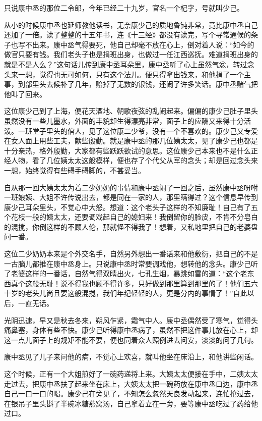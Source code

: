\documentclass[12pt,UTF8]{ctexbook}
\begin{document}
{{{只说康中丞的那位二令郎，今年已经二十九岁，官名一个杞字，号就叫少己。

从小的时候康中丞也延师教他读书，无奈康少己的质地鲁钝非常，竟比康中丞自己还加了一倍。读了整整的十五年书，连《十三经》都没有读完，写个寻常通候的条子也写不出来。康中丞气得要死，他自己却毫不放在心上，倒对着人说：“如今的做官只要有钱。我们老头子也是捐班出身，也做过一任江西巡抚。难道捐班出身的就是不是人么？”这句话儿传到康中丞耳朵里，康中丞听了心上虽然气忿，转过念头来一想，觉得也无可如何，只有这个法儿。便只得拿出钱来，和他捐了一个主事，到部里头去候补了几年，赔掉了无数的银钱，还闹了许多笑话。康中丞赌气把他叫了回来。

这位康少己到了上海，便花天酒地、朝歌夜弦的乱闹起来。偏偏的康少己肚子里头虽然没有一些儿墨水，外面的丰貌却生得漂亮非常，面子上的应酬又来得十分活泼。一班堂子里头的倌人，见了这位康二少爷，没有一个不喜欢的。康少己又专爱在女人面上用些工夫，献些殷勤。就是康中丞的那几位姨太太，见了康少己也都是十分亲热，格外殷勤，大家都有些跃跃欲试的意思。这位康少己本来也不是什么正经人物，看了几位姨太太这般模样，便也存了个代父从军的念头；却是回过念头来一想，始终觉得有些碍手碍脚的，不甚妥当。

自从那一回大姨太太为着二少奶奶的事情和康中丞闹了一回之后，虽然康中丞吩咐一班娘姨、大姐不许传说出去，都是同在一家的人，那里瞒得过？这个信息早传到康少己耳朵里头，不觉心中大怒。想道：这个老头子这样的不知廉耻！自己有了五个花枝一般的姨太太，还要调戏起自己的媳妇来！我倒留你的脸皮，不肯不分皂白的混搅，你倒这样的不顾人伦，那就怪不得我了！想着，又私地里把自己的老婆盘问一番。

这位二少奶奶本来是个外交名手，自然另外想出一番话来和他敷衍，把自己的不是一古脑儿都推在康中丞身上。只说康中丞时常要调戏他，想转他的念头。康少己听了老婆这样的一番话，自然气得双睛出火，七孔生烟，暴跳如雷的道：“这个老东西真个这般无耻！说不得我也顾不得许多，只好做到那里算到那里的了！他们五六十岁的老头儿尚且要这般混搅，我们年纪轻轻的人，更是分内的事情了！”自此以后，一直无话。

光阴迅速，早又是秋去冬来，朔风乍紧，霜气中人。康中丞偶然受了寒气，觉得头痛鼻塞，身体有些不快。康少己听得康中丞病了，虽然不把这件事儿放在心上，却这一点儿面子上的规矩不能不要，便也同着众人照例进去问安，淡淡的问了几句。

康中丞见了儿子来问他的病，不觉心上欢喜，就叫他坐在床沿上，和他讲些闲话。

这个时候，正有一个大姐煎好了一碗药递将上来。大姨太太便接在手中，二姨太太走过去，把康中丞扶了起来坐在床上，大姨太太把一碗药放在康中丞口边，康中丞自己一口一口的喝。康少己在旁见了，不知怎么忽然天良发动起来，连忙抢过去，在银吊子里头斟了半碗冰糖燕窝汤，自己拿着立在一旁，要等康中丞吃过了药给他过口。

}}}
\end{document}
